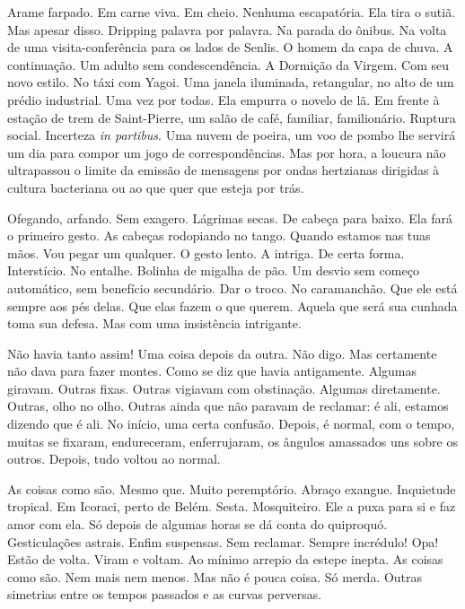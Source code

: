 Arame farpado. Em carne viva. Em cheio. Nenhuma escapatória. Ela tira o
sutiã. Mas apesar disso. Dripping palavra por palavra. Na parada do
ônibus. Na volta de uma visita-conferência para os lados de Senlis. O
homem da capa de chuva. A continuação. Um adulto sem condescendência. A
Dormição da Virgem. Com seu novo estilo. No táxi com Yagoi. Uma janela
iluminada, retangular, no alto de um prédio industrial. Uma vez por
todas. Ela empurra o novelo de lã. Em frente à estação de trem de
Saint-Pierre, um salão de café, familiar, familionário. Ruptura social.
Incerteza \emph{in partibus}. Uma nuvem de poeira, um voo de pombo lhe
servirá um dia para compor um jogo de correspondências. Mas por hora, a
loucura não ultrapassou o limite da emissão de mensagens por ondas
hertzianas dirigidas à cultura bacteriana ou ao que quer que esteja por
trás.

Ofegando, arfando. Sem exagero. Lágrimas secas. De cabeça para baixo.
Ela fará o primeiro gesto. As cabeças rodopiando no tango. Quando
estamos nas tuas mãos. Vou pegar um qualquer. O gesto lento. A intriga.
De certa forma. Interstício. No entalhe. Bolinha de migalha de pão. Um
desvio sem começo automático, sem benefício secundário. Dar o troco. No
caramanchão. Que ele está sempre aos pés delas. Que elas fazem o que
querem. Aquela que será sua cunhada toma sua defesa. Mas com uma
insistência intrigante.

Não havia tanto assim! Uma coisa depois da outra. Não digo. Mas
certamente não dava para fazer montes. Como se diz que havia
antigamente. Algumas giravam. Outras fixas. Outras vigiavam com
obstinação. Algumas diretamente. Outras, olho no olho. Outras ainda que
não paravam de reclamar: é ali, estamos dizendo que é ali. No início,
uma certa confusão. Depois, é normal, com o tempo, muitas se fixaram,
endureceram, enferrujaram, os ângulos amassados uns sobre os outros.
Depois, tudo voltou ao normal.

As coisas como são. Mesmo que. Muito peremptório. Abraço exangue.
Inquietude tropical. Em Icoraci, perto de Belém. Sesta. Mosquiteiro. Ele
a puxa para si e faz amor com ela. Só depois de algumas horas se dá
conta do quiproquó. Gesticulações astrais. Enfim suspensas. Sem
reclamar. Sempre incrédulo! Opa! Estão de volta. Viram e voltam. Ao
mínimo arrepio da estepe inepta. As coisas como são. Nem mais nem menos.
Mas não é pouca coisa. Só merda. Outras simetrias entre os tempos
passados e as curvas perversas.

